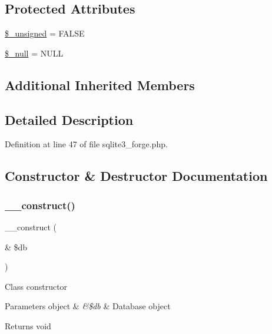 \subsection*{Protected Attributes}
\begin{DoxyCompactItemize}
\item 
\mbox{\hyperlink{class_c_i___d_b__sqlite3__forge_aae977ae6d61fa183f0b25422b6ddc31c}{\$\+\_\+unsigned}} = F\+A\+L\+SE
\item 
\mbox{\hyperlink{class_c_i___d_b__sqlite3__forge_ae58fe6a5104d4a069a49b27533ce808f}{\$\+\_\+null}} = \textquotesingle{}N\+U\+LL\textquotesingle{}
\end{DoxyCompactItemize}
\subsection*{Additional Inherited Members}


\subsection{Detailed Description}


Definition at line 47 of file sqlite3\+\_\+forge.\+php.



\subsection{Constructor \& Destructor Documentation}
\mbox{\label{class_c_i___d_b__sqlite3__forge_aaf2ef772755ec6f361d44e16cc9ffd69}} 
\subsubsection{\texorpdfstring{\_\_construct()}{\_\_construct()}}
{\footnotesize\ttfamily \+\_\+\+\_\+construct (\begin{DoxyParamCaption}\item[{\&}]{\$db }\end{DoxyParamCaption})}

Class constructor


\begin{DoxyParams}[1]{Parameters}
object & {\em \&\$db} & Database object \\
\hline
\end{DoxyParams}
\begin{DoxyReturn}{Returns}
void 
\end{DoxyReturn}


